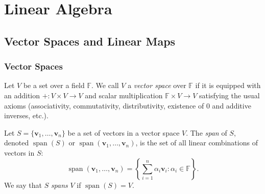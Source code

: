 \part{Linear Algebra}

\chapter{Vector Spaces and Linear Maps}

\section{Vector Spaces}

\begin{definition}
  Let $V$ be a set over a field $\mathbb{F}$.
  We call $V$ a \emph{vector space} over $\mathbb{F}$ if it is equipped with
  an addition $+ : V \times V \to V$ and scalar multiplication
  $\mathbb{F} \times V \to V$ satisfying the usual axioms
  (associativity, commutativity, distributivity, existence of $0$ and additive inverses, etc.).
\end{definition}

\begin{definition}[Span]
  Let $S = \{\mathbf{v}_1,\dots,\mathbf{v}_n\}$ be a set of vectors in a vector space $V$.
  The \emph{span} of $S$, denoted $\operatorname{span}(S)$ or $\operatorname{span}(\mathbf{v}_1,\dots,\mathbf{v}_n)$,
  is the set of all linear combinations of vectors in $S$:
  \begin{equation}
    \operatorname{span}(\mathbf{v}_1,\dots,\mathbf{v}_n) = \left\{ \sum_{i=1}^{n} \alpha_i \mathbf{v}_i : \alpha_i \in \mathbb{F} \right\}.
  \end{equation}
  We say that $S$ \emph{spans} $V$ if $\operatorname{span}(S) = V$.
\end{definition}

\begin{center}
\end{center}

